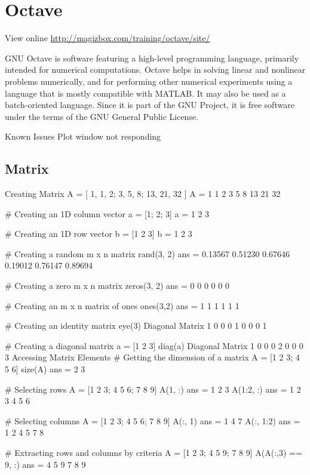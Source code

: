 \chapter{Octave}

View online \href{http://magizbox.com/training/octave/site/}{http://magizbox.com/training/octave/site/}

GNU Octave is software featuring a high-level programming language, primarily intended for numerical computations. Octave helps in solving linear and nonlinear problems numerically, and for performing other numerical experiments using a language that is mostly compatible with MATLAB. It may also be used as a batch-oriented language. Since it is part of the GNU Project, it is free software under the terms of the GNU General Public License.

Known Issues
Plot window not responding

\section{Matrix}

Creating Matrix
A = [ 1, 1, 2; 3, 5, 8; 13, 21, 32 ]
A =
    1    1    2
    3    5    8
   13   21   32

# Creating an 1D column vector
a = [1; 2; 3]
a =
   1
   2
   3

# Creating an 1D row vector
b = [1 2 3]
b =
   1   2   3

# Creating a random m x n matrix
rand(3, 2)
ans =
   0.13567   0.51230
   0.67646   0.19012
   0.76147   0.89694

# Creating a zero m x n matrix
zeros(3, 2)
ans =
   0   0
   0   0
   0   0

# Creating an m x n matrix of ones
ones(3,2)
ans =
   1   1
   1   1
   1   1

# Creating an identity matrix
eye(3)
Diagonal Matrix
   1   0   0
   0   1   0
   0   0   1

# Creating a diagonal matrix
a = [1 2 3]
diag(a)
Diagonal Matrix
   1   0   0
   0   2   0
   0   0   3
Accessing Matrix Elements
# Getting the dimension of a matrix
A = [1 2 3; 4 5 6]
size(A)
ans =
   2   3

# Selecting rows
A = [1 2 3; 4 5 6; 7 8 9]
A(1, :)
ans =
   1   2   3
A(1:2, :)
ans =
   1   2   3
   4   5   6

# Selecting columns
A = [1 2 3; 4 5 6; 7 8 9]
A(:, 1)
ans =
   1
   4
   7
A(:, 1:2)
ans =
   1   2
   4   5
   7   8

# Extracting rows and columns by criteria
A = [1 2 3; 4 5 9; 7 8 9]
A(A(:,3) == 9, :)
ans =
   4   5   9
   7   8   9

